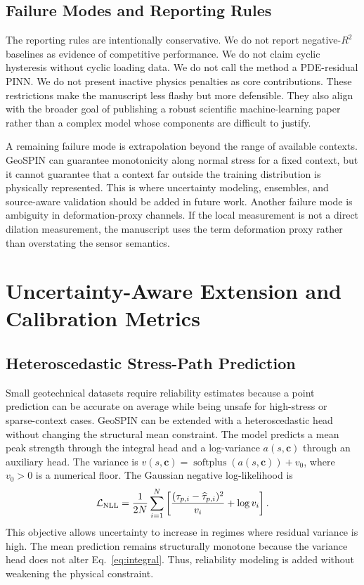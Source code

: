 \documentclass[journal]{IEEEtran}
\begin{document}
\subsection{Failure Modes and Reporting Rules}
The reporting rules are intentionally conservative. We do not report negative-$R^2$ baselines as evidence of competitive performance. We do not claim cyclic hysteresis without cyclic loading data. We do not call the method a PDE-residual PINN. We do not present inactive physics penalties as core contributions. These restrictions make the manuscript less flashy but more defensible. They also align with the broader goal of publishing a robust scientific machine-learning paper rather than a complex model whose components are difficult to justify.

A remaining failure mode is extrapolation beyond the range of available contexts. GeoSPIN can guarantee monotonicity along normal stress for a fixed context, but it cannot guarantee that a context far outside the training distribution is physically represented. This is where uncertainty modeling, ensembles, and source-aware validation should be added in future work. Another failure mode is ambiguity in deformation-proxy channels. If the local measurement is not a direct dilation measurement, the manuscript uses the term deformation proxy rather than overstating the sensor semantics.
\section{Uncertainty-Aware Extension and Calibration Metrics}
\subsection{Heteroscedastic Stress-Path Prediction}
Small geotechnical datasets require reliability estimates because a point prediction can be accurate on average while being unsafe for high-stress or sparse-context cases. GeoSPIN can be extended with a heteroscedastic head without changing the structural mean constraint. The model predicts a mean peak strength through the integral head and a log-variance $a(s,\mathbf{c})$ through an auxiliary head. The variance is $v(s,\mathbf{c})=\operatorname{softplus}(a(s,\mathbf{c}))+v_0$, where $v_0>0$ is a numerical floor. The Gaussian negative log-likelihood is
\begin{equation}
\mathcal{L}_{\rm NLL}=\frac{1}{2N}\sum_{i=1}^{N}\left[\frac{(\tau_{p,i}-\widehat{\tau}_{p,i})^2}{v_i}+\log v_i\right].
\end{equation}
This objective allows uncertainty to increase in regimes where residual variance is high. The mean prediction remains structurally monotone because the variance head does not alter Eq.~\eqref{eq:integral}. Thus, reliability modeling is added without weakening the physical constraint.
\end{document}
